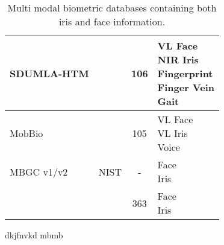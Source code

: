 \begin{table}[H]
\begin{tabularx}{1.2\textwidth}{ XccX }
\hline
\rowcolor{lightGrey}
SDUMLA-HTM&\cite{Yin2011}&106&\makecell{VL Face  \\ NIR Iris \\ Fingerprint \\ Finger Vein\\Gait\\} \\
\hline
MobBio&\cite{Sequeira2014}&105& \makecell{VL Face \\ VL Iris \\ Voice} \\
\hline
\rowcolor{lightGrey}
MBGC v1/v2&NIST&-&\makecell{Face\\Iris}\\
\hline
&\cite{Bowyer2016b}&363&\makecell{Face\\Iris}\\
\hline
\end{tabularx}
\label{MultiDatabase}
\caption{Multi modal biometric databases containing both iris and face information.}
\end{table}

dkjfnvkd  mbmb















